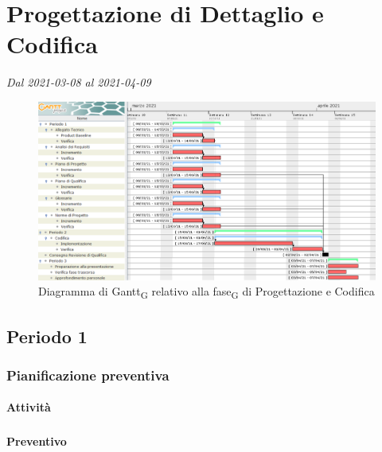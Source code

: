 \section{Progettazione di Dettaglio e Codifica}
\textit{Dal 2021-03-08 al 2021-04-09}

\begin{figure}[H]
	\centering
	\includegraphics[scale=0.48]{res/images/gantt_fase/04_gantt_codifica_obbligatori.png}
	\caption{Diagramma di Gantt\textsubscript{G} relativo alla fase\textsubscript{G} di Progettazione  e Codifica}
\end{figure}


\subsection{Periodo 1}

\subsubsection{Pianificazione preventiva}

\paragraph{Attività}
\subparagraph*{}

\planningTable{
	
}

\paragraph{Preventivo}
\subparagraph*{}

